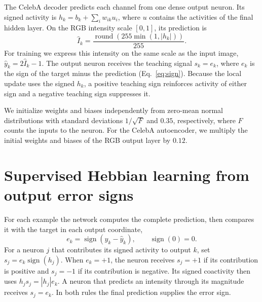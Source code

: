 \documentclass[10pt]{article}
\DeclareMathOperator{\sgn}{sign}
\begin{document}
The CelebA decoder predicts each channel from one dense output neuron. Its signed activity is $h_k=b_k+\sum_i w_{ik}u_i$, where $u$ contains the activities of the final hidden layer. On the RGB intensity scale $[0,1]$, its prediction is
\begin{equation}
 \hat I_k=\frac{\operatorname{round}\!\left(255\min(1,|h_k|)\right)}{255}.
 \label{eq:intensity}
\end{equation}
For training we express this intensity on the same scale as the input image, $\hat y_k=2\hat I_k-1$. The output neuron receives the teaching signal $s_k=e_k$, where $e_k$ is the sign of the target minus the prediction (Eq.~\ref{eq:sign}). Because the local update uses the signed $h_k$, a positive teaching sign reinforces activity of either sign and a negative teaching sign suppresses it.

We initialize weights and biases independently from zero-mean normal distributions with standard deviations $1/\sqrt{F}$ and $0.35$, respectively, where $F$ counts the inputs to the neuron. For the CelebA autoencoder, we multiply the initial weights and biases of the RGB output layer by $0.12$.

\section{Supervised Hebbian learning from output error signs}
For each example the network computes the complete prediction, then compares it with the target in each output coordinate,
\begin{equation}
 e_k=\sgn(y_k-\hat y_k),\qquad \sgn(0)=0 .
 \label{eq:sign}
\end{equation}
For a neuron $j$ that contributes its signed activity to output $k$, set $s_j=e_k\sgn(h_j)$. When $e_k=+1$, the neuron receives $s_j=+1$ if its contribution is positive and $s_j=-1$ if its contribution is negative. Its signed coactivity then uses $h_js_j=|h_j|e_k$. A neuron that predicts an intensity through its magnitude receives $s_j=e_k$. In both rules the final prediction supplies the error sign.
\end{document}

